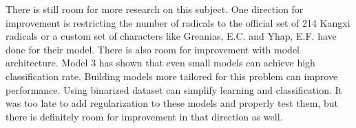 \documentclass{article}
\begin{document}
\begin{CJK*}{UTF8}{min}
There is still room for more research on this subject. One direction for improvement is restricting the number of radicals to the official set of 214 Kangxi radicals or a custom set of characters like Greanias, E.C. and Yhap, E.F. have done for their model. There is also room for improvement with model architecture. Model 3 has shown that even small models can achieve high classification rate. Building models more tailored for this problem can improve performance. Using binarized dataset can simplify learning and classification. It was too late to add regularization to these models and properly test them, but there is definitely room for improvement in that direction as well.


{}


\end{CJK*}
\end{document}

